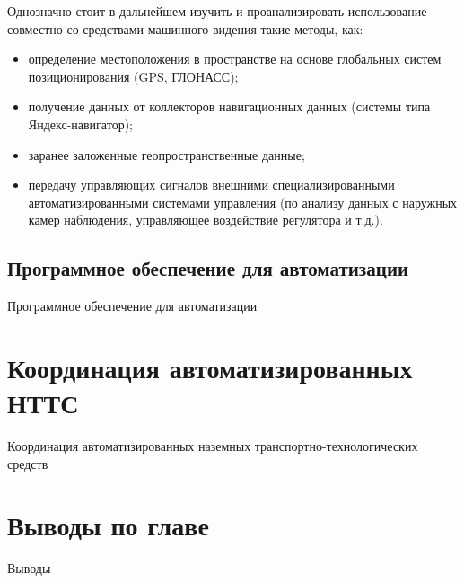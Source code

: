 Однозначно стоит в дальнейшем изучить и проанализировать использование совместно со средствами машинного видения такие методы, как:

\begin{itemize}
    \item определение местоположения в пространстве на основе глобальных систем позиционирования (GPS, ГЛОНАСС);
    \item получение данных от коллекторов навигационных данных (системы типа Яндекс-навигатор);
    \item заранее заложенные геопространственные данные;
    \item передачу управляющих сигналов внешними специализированными автоматизированными системами управления (по анализу данных с наружных камер наблюдения, управляющее воздействие регулятора и т.д.).
\end{itemize}


\subsection{Программное обеспечение для автоматизации}\label{subsec:ch1/sec2/sub3}

Программное обеспечение для автоматизации

\section{Координация автоматизированных НТТС}\label{sec:ch1/sec3}

Координация автоматизированных наземных транспортно-технологических средств

\section{Выводы по главе}\label{sec:ch1/sec4}

Выводы

\FloatBarrier
